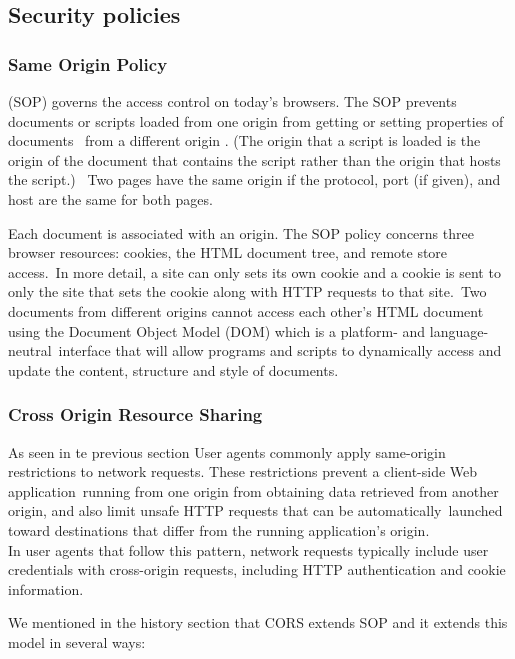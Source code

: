 \documentclass[a4paper,12pt]{paper}
\begin{document}
\subsection{Security policies}

\subsubsection{Same Origin Policy}

\label{label:SOP}
(SOP) governs the access control on today’s browsers. The SOP prevents documents or scripts loaded from one origin from getting or setting properties of documents \
from a different origin . (The origin that a script is loaded is the origin of the document that contains the script rather than the origin that hosts the script.) \
Two pages have the same origin if the protocol, port (if given), and host are the same for both pages.

Each document is associated with an origin. The SOP policy concerns three browser resources: cookies, the HTML document tree, and remote store access.\
In more detail, a site can only sets its own cookie and a cookie is sent to only the site that sets the cookie along with HTTP requests to that site.\
Two documents from different origins cannot access each other’s HTML document using the Document Object Model (DOM) which is a platform- and language-neutral\
interface that will allow programs and scripts to dynamically access and update the content, structure and style of documents.\\


\subsubsection{Cross Origin Resource Sharing}
\label{label:CORS}

As seen in te previous section User agents commonly apply same-origin restrictions to network requests. These restrictions prevent a client-side Web application\
running from one origin from obtaining data retrieved from another origin, and also limit unsafe HTTP requests that can be automatically\
launched toward destinations that differ from the running application's origin.\\

In user agents that follow this pattern, network requests typically include user credentials with cross-origin requests, including HTTP authentication and cookie information.

We mentioned in the history section that CORS extends SOP and it extends this model in several ways:
\end{document}
